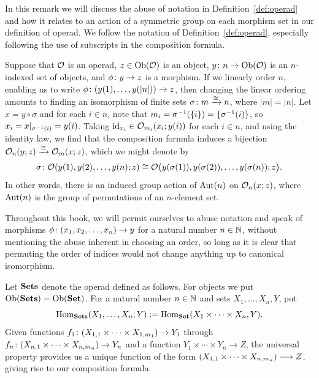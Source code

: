 \documentclass[CT4S-EN-RU]{subfiles}
\begin{document}
\begin{remarkENG}\label{rem:symmetry}
In this remark we will discuss the abuse of notation in Definition~\ref{def:operad} and how it relates to an action of a symmetric group on each morphism set in our definition of operad. We follow the notation of Definition~\ref{def:operad}, especially following the use of subscripts in the composition formula.

Suppose that $\mathcal{O}$ is an operad, $z\in\textnormal{Ob}(\mathcal{O})$ is an object, $y\colon n\rightarrow\textnormal{Ob}(\mathcal{O})$ is an $n$-indexed set of objects, and $\phi\colon y\rightarrow z$ is a morphism. If we linearly order $n$, enabling us to write $\phi\colon (y(1),\ldots,y(|n|))\rightarrow z$, then changing the linear ordering amounts to finding an isomorphism of finite sets $\sigma\colon m\xrightarrow{\cong} n$, where $|m|=|n|$. Let $x=y\circ\sigma$ and for each $i\in n$, note that $m_i=\sigma^\m1(\{i\})=\{\sigma^\m1(i)\}$, so $x_i=x|_{\sigma^\m1(i)}=y(i)$. Taking $\textnormal{id}_{x_i}\in\mathcal{O}_{m_i}(x_i;y(i))$ for each $i\in n$, and using the identity law, we find that the composition formula induces a bijection $\mathcal{O}_n(y;z)\xrightarrow{\cong}\mathcal{O}_m(x;z)$, which we might denote by 
$$\sigma\colon\mathcal{O}(y(1),y(2),\ldots,y(n);z)\cong\mathcal{O}\big(y(\sigma(1)),y(\sigma(2)),\ldots,y(\sigma(n));z\big).$$
In other words, there is an induced group action of $\textnormal{Aut}(n)$ on $\mathcal{O}_n(x;z)$, where $\textnormal{Aut}(n)$ is the group of permutations of an $n$-element set.

Throughout this book, we will permit ourselves to abuse notation and speak of morphisms $\phi\colon (x_1,x_2,\ldots,x_n)\rightarrow y$ for a natural number $n\in{\mathbb N}$, without mentioning the abuse inherent in choosing an order, so long as it is clear that permuting the order of indices would not change anything up to canonical isomorphism.
\end{remarkENG}

\begin{remarkRUS}\label{rem:symmetry}
\end{remarkRUS}

\begin{exampleENG}
Let ${\mathbf{Sets}}$ denote the operad defined as follows. For objects we put $\textnormal{Ob}({\mathbf{Sets}})=\textnormal{Ob}({\mathbf{Set}})$. For a natural number $n\in{\mathbb N}$ and sets $X_1,\ldots,X_n,Y$, put 
$$\textnormal{Hom}_{\mathbf{Sets}}(X_1,\ldots,X_n;Y):=\textnormal{Hom}_{\mathbf{Set}}(X_1\times\cdots\times X_n,Y).$$
Given functions $f_1\colon(X_{1,1}\times\cdots\times X_{1,m_1})\rightarrow Y_1$ through $f_n\colon (X_{n,1}\times\cdots\times X_{n,m_n})\rightarrow Y_n$ and a function $Y_1\times\cdots\times Y_n\to Z$, the universal property provides us a unique function of the form $(X_{1,1}\times\cdots\times X_{n,m_n})\longrightarrow Z$, giving rise to our composition formula.
\end{exampleENG}
\end{document}
